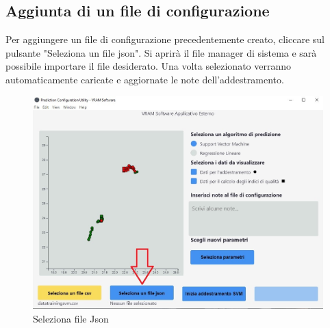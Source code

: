 	\subsection{Aggiunta di un file di configurazione}
	Per aggiungere un file di configurazione precedentemente creato, cliccare sul pulsante "Seleziona un file json".
	Si aprirà il file manager di sistema e sarà possibile importare il file desiderato. Una volta selezionato verranno automaticamente caricate e aggiornate le note dell'addestramento.
	\begin{figure}[H] 	
		\begin{center}
			\includegraphics[width=\linewidth]{img/3.jpg}
		\end{center}
		\caption{Seleziona file Json}	
	\end{figure}
